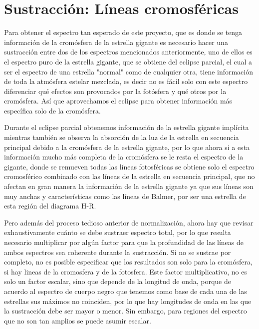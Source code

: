 \documentclass[12pt,oneside,openany,letter]{book}
\begin{document}



\section{Sustracción: Líneas cromosféricas}\label{sec:sustraccion}

Para obtener el espectro tan esperado de este proyecto, que es donde se tenga información de la cromósfera de la estrella gigante es necesario hacer una sustracción entre dos de los espectros mencionados anteriormente, uno de ellos es el espectro puro de la estrella gigante, que se obtiene del eclipse parcial, el cual a ser el espectro de una estrella "normal" como de cualquier otra, tiene información de toda la atmósfera estelar mezclada, es decir no es fácil solo con este espectro diferenciar qué efectos son provocados por la fotósfera y qué otros por la cromósfera. Así que aprovechamos el eclipse para obtener información más específica solo de la cromósfera.

Durante el eclipse parcial obtenemos información de la estrella gigante implícita mientras también se observa la absorción de la luz de la estrella en secuencia principal debido a la cromósfera de la estrella gigante, por lo que ahora si a esta información mucho más completa de la cromósfera se le resta el espectro de la gigante, donde se remueven todas las líneas fotosféricas se obtiene solo el espectro cromosférico combinado con las líneas de la estrella en secuencia principal, que no afectan en gran manera la información de la estrella gigante ya que sus líneas son muy anchas y características como las líneas de Balmer, por ser una estrella de esta región del diagrama H-R.

Pero además del proceso tedioso anterior de normalización, ahora hay que revisar exhaustivamente cuánto se debe sustraer espectro total, por lo que resulta necesario multiplicar por algún factor para que la profundidad de las líneas de ambos espectros sea coherente durante la sustracción. Si no se sustrae por completo, no es posible especificar que los resultados son solo para la cromósfera, si hay lineas de la cromosfera y de la fotosfera. Este factor multiplicativo, no es solo un factor escalar, sino que depende de la longitud de onda, porque de acuerdo al espectro de cuerpo negro que tenemos como base de cada una de las estrellas sus máximos no coinciden, por lo que hay longitudes de onda en las que la sustracción debe ser mayor o menor. Sin embargo, para regiones del espectro que no son tan amplios se puede asumir escalar.
\end{document}
